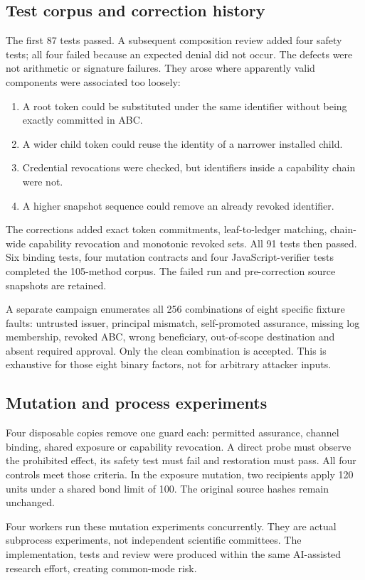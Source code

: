 \documentclass[journal,10pt]{IEEEtran}
\begin{document}
\subsection{Test corpus and correction history}
The first 87 tests passed. A subsequent composition review added four safety tests; all four failed because an expected denial did not occur. The defects were not arithmetic or signature failures. They arose where apparently valid components were associated too loosely:
\begin{enumerate}
\item A root token could be substituted under the same identifier without being exactly committed in ABC.
\item A wider child token could reuse the identity of a narrower installed child.
\item Credential revocations were checked, but identifiers inside a capability chain were not.
\item A higher snapshot sequence could remove an already revoked identifier.
\end{enumerate}
The corrections added exact token commitments, leaf-to-ledger matching, chain-wide capability revocation and monotonic revoked sets. All 91 tests then passed. Six binding tests, four mutation contracts and four JavaScript-verifier tests completed the 105-method corpus. The failed run and pre-correction source snapshots are retained.

A separate campaign enumerates all 256 combinations of eight specific fixture faults: untrusted issuer, principal mismatch, self-promoted assurance, missing log membership, revoked ABC, wrong beneficiary, out-of-scope destination and absent required approval. Only the clean combination is accepted. This is exhaustive for those eight binary factors, not for arbitrary attacker inputs.

\subsection{Mutation and process experiments}
Four disposable copies remove one guard each: permitted assurance, channel binding, shared exposure or capability revocation. A direct probe must observe the prohibited effect, its safety test must fail and restoration must pass. All four controls meet those criteria. In the exposure mutation, two recipients apply 120 units under a shared bond limit of 100. The original source hashes remain unchanged.

Four workers run these mutation experiments concurrently. They are actual subprocess experiments, not independent scientific committees. The implementation, tests and review were produced within the same AI-assisted research effort, creating common-mode risk.
\end{document}
